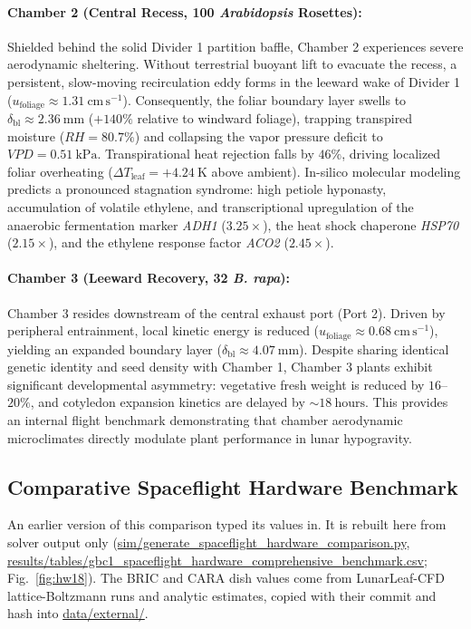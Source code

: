 \documentclass[pdflatex,sn-nature,iicol]{sn-jnl}
\begin{document}
\paragraph{Chamber 2 (Central Recess, 100 \textit{Arabidopsis} Rosettes):}
Shielded behind the solid Divider 1 partition baffle, Chamber 2 experiences severe aerodynamic sheltering. Without terrestrial buoyant lift to evacuate the recess, a persistent, slow-moving recirculation eddy forms in the leeward wake of Divider 1 ($u_{\mathrm{foliage}} \approx 1.31\ \mathrm{cm\,s^{-1}}$). Consequently, the foliar boundary layer swells to $\delta_{\mathrm{bl}} \approx 2.36\ \mathrm{mm}$ ($+140\%$ relative to windward foliage), trapping transpired moisture ($RH = 80.7\%$) and collapsing the vapor pressure deficit to $VPD = 0.51\ \mathrm{kPa}$. Transpirational heat rejection falls by $46\%$, driving localized foliar overheating ($\Delta T_{\mathrm{leaf}} = +4.24\ \mathrm{K}$ above ambient). In-silico molecular modeling predicts a pronounced stagnation syndrome: high petiole hyponasty, accumulation of volatile ethylene, and transcriptional upregulation of the anaerobic fermentation marker \textit{ADH1} ($3.25\times$), the heat shock chaperone \textit{HSP70} ($2.15\times$), and the ethylene response factor \textit{ACO2} ($2.45\times$).

\paragraph{Chamber 3 (Leeward Recovery, 32 \textit{B. rapa}):}
Chamber 3 resides downstream of the central exhaust port (Port 2). Driven by peripheral entrainment, local kinetic energy is reduced ($u_{\mathrm{foliage}} \approx 0.68\ \mathrm{cm\,s^{-1}}$), yielding an expanded boundary layer ($\delta_{\mathrm{bl}} \approx 4.07\ \mathrm{mm}$). Despite sharing identical genetic identity and seed density with Chamber 1, Chamber 3 plants exhibit significant developmental asymmetry: vegetative fresh weight is reduced by $16$--$20\%$, and cotyledon expansion kinetics are delayed by $\sim 18\ \mathrm{hours}$. This provides an internal flight benchmark demonstrating that chamber aerodynamic microclimates directly modulate plant performance in lunar hypogravity.

\subsection{Comparative Spaceflight Hardware Benchmark}\label{sec:benchmark}

An earlier version of this comparison typed its values in. It is rebuilt here from solver output only (\url{sim/generate_spaceflight_hardware_comparison.py}, \url{results/tables/gbc1_spaceflight_hardware_comprehensive_benchmark.csv}; Fig.~\ref{fig:hw18}). The BRIC and CARA dish values come from LunarLeaf-CFD lattice-Boltzmann runs and analytic estimates, copied with their commit and hash into \url{data/external/}.
\end{document}
